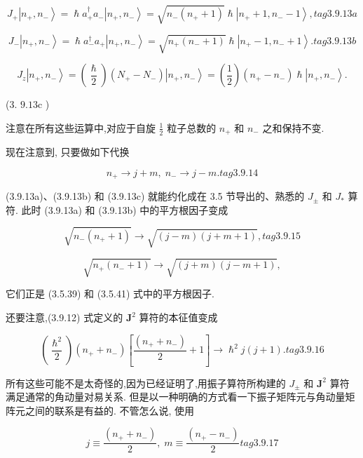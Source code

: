 $$
{J}_{ + }\left| {{n}_{ + },{n}_{ - }}\right\rangle = \hslash {a}_{ + }^{ \dagger }{a}_{ - }\left| {{n}_{ + },{n}_{ - }}\right\rangle = \sqrt{{n}_{ - }\left( {{n}_{ + } + 1}\right) }\hslash \left| {{n}_{ + } + 1,{n}_{ - } - 1}\right\rangle , tag{3.9.13a}
$$

$$
{J}_{ - }\left| {{n}_{ + },{n}_{ - }}\right\rangle = \hslash {a}_{ - }^{ \dagger }{a}_{ + }\left| {{n}_{ + },{n}_{ - }}\right\rangle = \sqrt{{n}_{ + }\left( {{n}_{ - } + 1}\right) }\hslash \left| {{n}_{ + } - 1,{n}_{ - } + 1}\right\rangle . tag{3.9.13b}
$$

$$
{J}_{z}\left| {{n}_{ + },{n}_{ - }}\right\rangle = \left( \frac{\hslash }{2}\right) \left( {{N}_{ + } - {N}_{ - }}\right) \left| {{n}_{ + },{n}_{ - }}\right\rangle = \left( \frac{1}{2}\right) \left( {{n}_{ + } - {n}_{ - }}\right) \hslash \left| {{n}_{ + },{n}_{ - }}\right\rangle .
$$

(3. ${9.13}\mathrm{c}$ )

注意在所有这些运算中,对应于自旋 $\frac{1}{2}$ 粒子总数的 ${n}_{ + }$ 和 ${n}_{ - }$ 之和保持不变.

现在注意到, 只要做如下代换

$$
{n}_{ + } \rightarrow j + m,\;{n}_{ - } \rightarrow j - m. tag{3.9.14}
$$

(3.9.13a)、(3.9.13b) 和 (3.9.13c) 就能约化成在 3.5 节导出的、熟悉的 ${J}_{ \pm }$ 和 ${J}_{ * }$ 算符. 此时 (3.9.13a) 和 (3.9.13b) 中的平方根因子变成

$$
\sqrt{{n}_{ - }\left( {{n}_{ + } + 1}\right) } \rightarrow \sqrt{\left( {j - m}\right) \left( {j + m + 1}\right) }, tag{3.9.15}
$$

$$
\sqrt{{n}_{ + }\left( {{n}_{ - } + 1}\right) } \rightarrow \sqrt{\left( {j + m}\right) \left( {j - m + 1}\right) },
$$

它们正是 (3.5.39) 和 (3.5.41) 式中的平方根因子.

还要注意,(3.9.12) 式定义的 ${\mathbf{J}}^{2}$ 算符的本征值变成

$$
\left( \frac{{\hslash }^{2}}{2}\right) \left( {{n}_{ + } + {n}_{ - }}\right) \left\lbrack {\frac{\left( {n}_{ + } + {n}_{ - }\right) }{2} + 1}\right\rbrack \rightarrow {\hslash }^{2}j\left( {j + 1}\right) . tag{3.9.16}
$$

所有这些可能不是太奇怪的,因为已经证明了,用振子算符所构建的 ${J}_{ \pm }$ 和 ${\mathbf{J}}^{2}$ 算符满足通常的角动量对易关系. 但是以一种明确的方式看一下振子矩阵元与角动量矩阵元之间的联系是有益的. 不管怎么说, 使用

$$
j \equiv \frac{\left( {n}_{ + } + {n}_{ - }\right) }{2},\;m \equiv \frac{\left( {n}_{ + } - {n}_{ - }\right) }{2} tag{3.9.17}
$$

